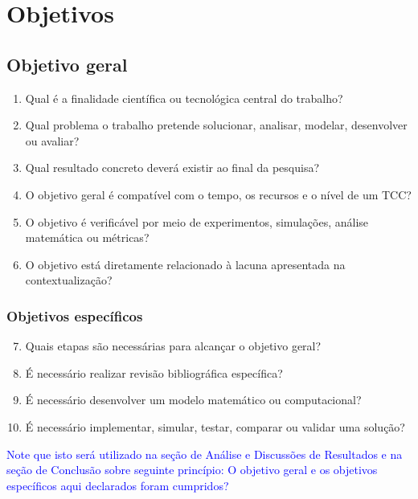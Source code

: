 \section{Objetivos}

\subsection{Objetivo geral}

\begin{enumerate}
	\item Qual é a finalidade científica ou tecnológica central do trabalho?
	\item Qual problema o trabalho pretende solucionar, analisar, modelar, desenvolver ou avaliar?
	\item Qual resultado concreto deverá existir ao final da pesquisa?
	\item O objetivo geral é compatível com o tempo, os recursos e o nível de um TCC?
	\item O objetivo é verificável por meio de experimentos, simulações, análise matemática ou métricas?
	\item O objetivo está diretamente relacionado à lacuna apresentada na contextualização?
\end{enumerate}

\subsubsection{Objetivos específicos}

\begin{enumerate}
	\setcounter{enumi}{6}
	\item Quais etapas são necessárias para alcançar o objetivo geral?
	\item É necessário realizar revisão bibliográfica específica?
	\item É necessário desenvolver um modelo matemático ou computacional?
	\item É necessário implementar, simular, testar, comparar ou validar uma solução?
\end{enumerate}

%
\textcolor{blue}{Note que isto será utilizado na seção de Análise e Discussões de Resultados e na seção de Conclusão
sobre seguinte princípio: O objetivo geral e os objetivos específicos aqui declarados foram cumpridos?
}

